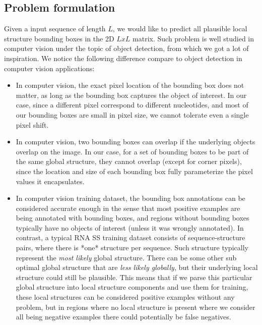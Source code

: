 \documentclass[12pt]{article}
\begin{document}
\subsection{Problem formulation}

Given a input sequence of length $L$,
we would like to predict all plausible local structure bounding boxes in the 2D $L x L$ matrix.
Such problem is well studied in computer vision under the topic of object detection,
from which we got a lot of inspiration.
We notice the following difference compare to object detection in computer vision applications:

\begin{itemize}
    \item In computer vision, the exact pixel location of the bounding box does not matter,
    as long as the bounding box captures the object of interest.
    In our case, since a different pixel correspond to different nucleotides,
    and most of our bounding boxes are small in pixel size, we cannot tolerate even a single pixel shift.

    \item In computer vision, two bounding boxes can overlap
    if the underlying objects overlap on the image. In our case, for a set of bounding boxes to
    be part of the same global structure, they cannot overlap (except for corner pixels),
    since the location and size of each bounding box fully parameterize the pixel values it encapsulates.

    \item In computer vision training dataset, the bounding box annotations can be considered
    accurate enough in the sense that most positive examples are being annotated with bounding boxes,
    and regions without bounding boxes typically have no objects of interest (unless it was wrongly annotated).
    In contrast, a typical RNA SS training dataset consists of sequence-structure pairs,
    where there is *one* structure per sequence. Such structure typically represent the \textit{most likely}
    global structure. There can be some other sub optimal global structure that are \textit{less likely globally},
    but their underlying local structure could still be plausible.
    This means that if we parse this particular global structure into local structure components and use them for training,
    these local structures can be considered positive examples without any problem,
    but in regions where no local structure is present where we consider all being negative examples there could potentially be false negatives.
\end{itemize}
\end{document}
